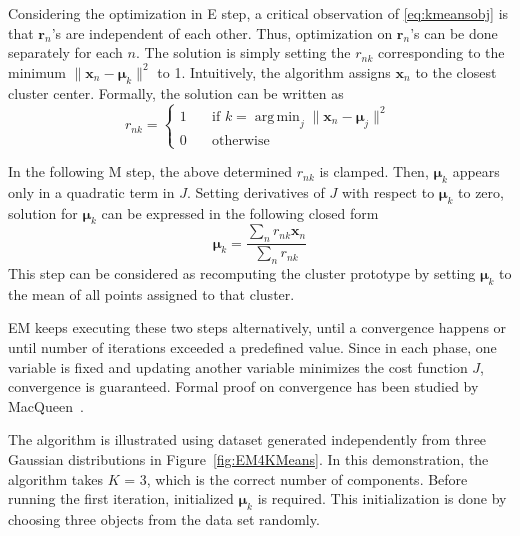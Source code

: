 Considering the optimization in E step, a critical observation of \eqref{eq:kmeansobj} is that \(\mathbf{r}_n\)'s are independent of each other. Thus, optimization on \(\mathbf{r}_n\)'s can be done separately for each \(n\). The solution is simply setting the \(r_{nk}\) corresponding to the minimum \(\| \mathbf{x}_n - \boldsymbol{\mu}_k \|^2\) to 1.  Intuitively, the algorithm assigns \(\mathbf{x}_n\) to the closest cluster center. Formally, the solution can be written as
\begin{equation}
 r_{nk} =
    \begin{cases}
        1   & \quad \text{if } k = \operatorname{arg\,min}_j \parallel \mathbf{x}_{n} - \mathbf{\mu}_{j} {\parallel}^2 \\
        0   & \quad \text{otherwise}
    \end{cases}
\end{equation}

In the following M step, the above determined \(r_{nk}\) is clamped. Then, \(\boldsymbol{\mu}_k\) appears only in a quadratic term in \(J\). Setting derivatives of \(J\) with respect to \(\boldsymbol{\mu}_k\) to zero, solution for \(\boldsymbol{\mu}_k\) can be expressed in the following closed form
\begin{equation}
	\label{eq:muupdate}
	\boldsymbol{\mu}_{k} = \frac{\sum_n r_{nk}\mathbf{x}_n}{\sum_n r_{nk}}
\end{equation}
This step can be considered as recomputing the cluster prototype by setting \(\boldsymbol{\mu}_k\) to the mean of all points assigned to that cluster. 

EM keeps executing these two steps alternatively, until a convergence happens or until number of iterations exceeded a predefined value. Since in each phase, one variable is fixed and updating another variable minimizes the cost function \(J\), convergence is guaranteed. Formal proof on convergence has been studied by MacQueen~\cite{macqueen1967some}.

The algorithm is illustrated using dataset generated independently from three Gaussian distributions in Figure~\ref{fig:EM4KMeans}. In this demonstration, the algorithm takes \(K\) = 3, which is the correct number of components. Before running the first iteration, initialized \(\boldsymbol{\mu}_k\) is required. This initialization is done by choosing three objects from the data set randomly.


